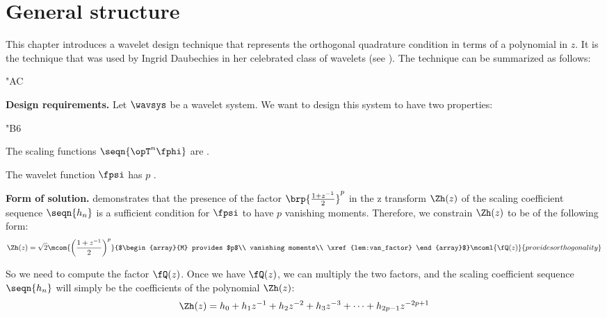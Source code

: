 \section{General structure}
This chapter introduces a wavelet design technique that represents the 
orthogonal quadrature condition in terms of a polynomial in $z$.
It is the technique that was used by Ingrid Daubechies in her celebrated
 class of wavelets (see ).
The technique can be summarized as follows:
\begin{dingautolist}{"AC}
  \item \textbf{Design requirements.} 
        Let $\wavsys$ be a wavelet system. %
        We want to design this system to have two properties:
    \begin{dingautolist}{"B6}
      \item The scaling functions $\seqn{\opT^n\fphi}$ are 
            .
      \item The wavelet function $\fpsi$ has $p$  .
    \end{dingautolist}

  \item \textbf{Form of solution.} 
         demonstrates that the presence of the 
        factor $\brp{\frac{1+z^{-1}}{2}}^p$ 
        in the z transform $\Zh(z)$ of the scaling coefficient sequence $\seqn{h_n}$
        is a sufficient condition for $\fpsi$ to have $p$ vanishing moments.
        Therefore, we constrain $\Zh(z)$ to be of the following form:
        \[
          \Zh(z) = 
          \sqrt{2}\mcom{\left(\frac{1+z^{-1}}{2}\right)^p}
                       {$\begin{array}{M}
                           provides $p$\\ 
                           vanishing moments\\
                           \xref{lem:van_factor}
                         \end{array}$}
          \mcoml{\fQ(z)}{provides orthogonality}
        \]

        So we need to compute the factor $\fQ(z)$. 
        Once we have $\fQ(z)$, we can multiply the two factors, 
        and the scaling coefficient sequence $\seqn{h_n}$ will simply be the coefficients
        of the polynomial $\Zh(z)$:
        \[ \Zh(z) = h_0 + h_1 z^{-1} + h_2 z^{-2} + h_3 z^{-3} + \cdots + h_{2p-1}z^{-2p+1}\]


\end{dingautolist}
